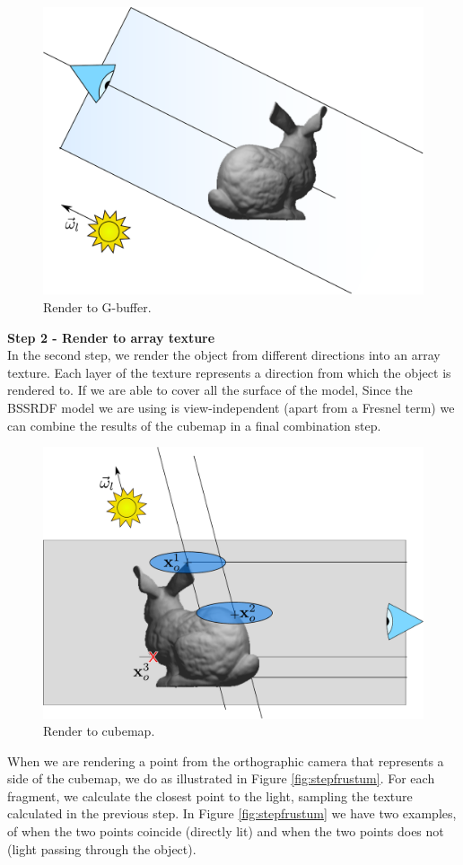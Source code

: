 \begin{figure}[!ht]
\centering
\includegraphics[width=0.5 \linewidth]{images/method/step1}
\caption{Render to G-buffer.}
\label{fig:step1}
\end{figure} 


\textbf{Step 2 - Render to array texture} \\
In the second step, we render the object from different directions into an array texture. Each layer of the texture represents a direction from which the object is rendered to. If we are able to cover all the surface of the model, 
Since the BSSRDF model we are using is view-independent (apart from a Fresnel term) we can combine the results of the cubemap in a final combination step.

\begin{figure}[!ht]
\centering
\includegraphics[width=0.5 \linewidth]{images/method/step2}
\caption{Render to cubemap.}
\label{fig:step2}
\end{figure} 

When we are rendering a point from the orthographic camera that represents a side of the cubemap, we do as illustrated in Figure \ref{fig:stepfrustum}. For each fragment, we calculate the closest point to the light, sampling the texture calculated in the previous step. In Figure  \ref{fig:stepfrustum} we have two examples, of when the two points coincide (directly lit) and when the two points does not (light passing through the object). 

